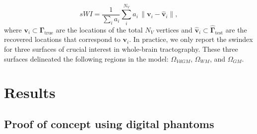 \documentclass[3p,authoryear,fleqn]{elsarticle}
\providecommand{\gammaset}{\ensuremath{\boldsymbol{\Gamma}}}
\renewcommand{\vec}[1]{\mathbf{#1}}
\begin{document}
  \begin{equation}
  sWI = \frac{1}{\sum_i a_i} \sum\limits_i^{N_V} a_i\,\|
  \vec{v}_i - \hat{\vec{v}}_i \|,
  \label{eq:swindex}
  \end{equation}
  where $\vec{v}_i \subset \gammaset_\text{true}$ are the locations of the total $N_V$ vertices
  and $\hat{\vec{v}}_i \subset \hat{\gammaset}_\text{test}$ are the recovered locations
  that correspond to $\vec{v}_i$.
In practice, we only report the \gls*{swindex} for three surfaces of crucial interest in whole-brain
  tractography.
These three surfaces delineated the following regions in the model: $\Omega_{VdGM}$, $\Omega_{WM}$, and $\Omega_{GM}$. 
\makeatletter{}\section{Results}
\label{sec:results}

\subsection{Proof of concept using digital phantoms}
\label{sec:results_phantom}
\end{document}
